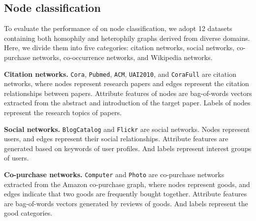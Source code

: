 \documentclass[sigconf, screen]{acmart}
\begin{document}
\begin{table}[ht]
\caption{Statistics on datasets for graph classification.}
\label{tab:gcdata}
\centering
\renewcommand\arraystretch{1.0}
\small
{}
\end{table} 
\subsection{Node classification}
To evaluate the performance of \name on node classification, we adopt 12 datasets containing both homophily and heterophily graphs derived from diverse domains.
Here, we divide them into five categories: citation networks, social networks, co-purchase networks, co-occurrence networks, and Wikipedia networks.

\textbf{Citation networks.}
\texttt{Cora}, \texttt{Pubmed}, \texttt{ACM}, \texttt{UAI2010}, and \texttt{CoraFull} are citation networks, where nodes represent research papers and edges represent the citation relationships between papers.
Attribute features of nodes are bag-of-words vectors extracted from the abstract and introduction of the target paper.
Labels of nodes represent the research topics of papers.

\textbf{Social networks.}
\texttt{BlogCatalog} and \texttt{Flickr} are social networks.
Nodes represent users, and edges represent their social relationships.
Attribute features are generated based on keywords of user profiles.
And labels represent interest groups of users.

\textbf{Co-purchase networks.}
\texttt{Computer} and \texttt{Photo} are co-purchase networks extracted from the Amazon co-purchase graph, where nodes represent goods, and edges indicate that two goods are frequently bought together.
Attribute features are bag-of-words vectors generated by reviews of goods.
And labels represent the good categories.
\end{document}
